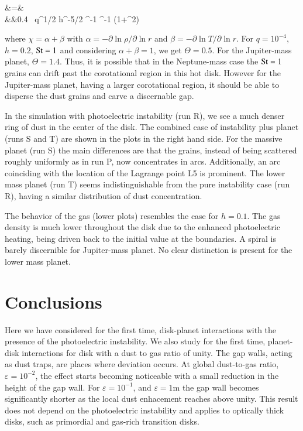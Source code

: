 \documentclass[onecolumn]{report}
\newcommand{\epsi}{\varepsilon}
\begin{document}
\beqn
\Theta &=& \\
&\approx&0.4 \ q^{1/2} h^{-5/2} \chi^{-1} \St^{-1} \left(1+\St^2\right)
\eeqn

\noindent where $\chi=\alpha+\beta$ with $\alpha=-\partial\ln \rho/\partial\ln r$ and
$\beta=-\partial\ln T/\partial\ln r$.  For $q=10^{-4}$, $h=0.2$, $\mathrm{St}=1$
and considering $\alpha+\beta=1$, we get $\Theta=0.5$. For the
Jupiter-mass planet, $\Theta=1.4$. Thus, it is possible that
in the Neptune-mass case the $\mathrm{St}=1$ grains can drift past the corotational
region in this hot disk. However for the Jupiter-mass planet, having a larger corotational region,
it should be able to disperse the dust grains and carve a discernable gap.

In the simulation with photoelectric instability (run R), we see a
much denser ring of dust in the center of the disk. The combined case
of instability plus planet (runs S and T) are shown in the plots in
the right hand side. For the massive planet (run S) the main differences are
that the grains, instead of being scattered roughly uniformly as in
run P, now concentrates in arcs. Additionally, an arc coinciding with
the location of the Lagrange point L5 is prominent. The lower mass
planet (run T) seems indistinguishable from the pure instability case
(run R), having a similar distribution of dust concentration.

The behavior of the gas (lower plots) resembles the case for
$h=0.1$. The gas density is much lower throughout the disk
due to the enhanced photoelectric heating, being driven back to the
initial value at the boundaries. A spiral is barely discernible for
Jupiter-mass planet. No clear distinction is present for the lower
mass planet.

\section{Conclusions}

Here we have considered for the first time, disk-planet interactions with the presence of the photoelectric instability. We also study for the first time, planet-disk interactions for disk with a dust to gas ratio of unity. The gap walls, acting as dust traps, are places where deviation occurs. At global dust-to-gas ratio, $\epsi=10^{-2}$, the effect starts becoming noticeable with a small reduction in the height of the gap wall. For $\epsi=10^{-1}$, and $\epsi=1$m the gap wall becomes significantly shorter as the local dust enhacement reaches above unity. This result does not depend on the photoelectric instability and applies to optically thick disks, such as primordial and gas-rich transition disks.
\end{document}
